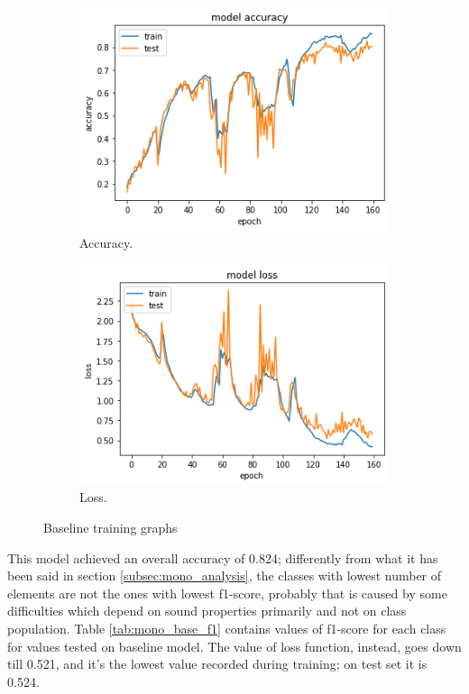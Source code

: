 \documentclass{article}
\begin{document}
\begin{figure}[h]
	\centering
	\begin{subfigure}{.5\textwidth}
		\centering
		\includegraphics[width=.9\linewidth]{./images/mono/baseline_acc.png}
		\caption{Accuracy.}
	\end{subfigure}%
	\begin{subfigure}{.5\textwidth}
		\centering
		\includegraphics[width=.9\linewidth]{./images/mono/baseline_loss.png}
		\caption{Loss.}
	\end{subfigure}
	\caption{Baseline training graphs}
	\label{fig:mono_base_result}
\end{figure}

This model achieved an overall accuracy of 0.824; differently from what it has been said in section \ref{subsec:mono_analysis}, the classes with lowest number of elements are not the ones with lowest f1-score, probably that is caused by some difficulties which depend on sound properties primarily and not on class population. Table \ref{tab:mono_base_f1} contains values of f1-score for each class for values tested on baseline model. The value of loss function, instead, goes down till 0.521, and it's the lowest value recorded during training; on test set it is 0.524. 
\end{document}
